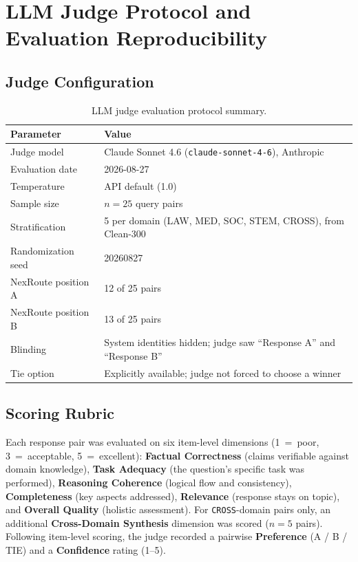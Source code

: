 \documentclass[a4paper,fleql,doubleblind]{cas-sc}
\begin{document}
\section{LLM Judge Protocol and Evaluation Reproducibility}
\label{supp:judge}

\subsection*{Judge Configuration}

\begin{table}[h]
\centering
\caption{LLM judge evaluation protocol summary.}
\small
\begin{tabular}{ll}
\toprule
\textbf{Parameter} & \textbf{Value} \\
\midrule
Judge model & Claude Sonnet 4.6 (\texttt{claude-sonnet-4-6}), Anthropic \\
Evaluation date & 2026-08-27 \\
Temperature & API default (1.0) \\
Sample size & $n{=}25$ query pairs \\
Stratification & 5 per domain (LAW, MED, SOC, STEM, CROSS), from Clean-300 \\
Randomization seed & 20260827 \\
NexRoute position A & 12 of 25 pairs \\
NexRoute position B & 13 of 25 pairs \\
Blinding & System identities hidden; judge saw ``Response A'' and ``Response B'' \\
Tie option & Explicitly available; judge not forced to choose a winner \\
\bottomrule
\end{tabular}
\end{table}

\subsection*{Scoring Rubric}

Each response pair was evaluated on six item-level dimensions
(1~=~poor, 3~=~acceptable, 5~=~excellent):
\textbf{Factual Correctness} (claims verifiable against domain knowledge),
\textbf{Task Adequacy} (the question's specific task was performed),
\textbf{Reasoning Coherence} (logical flow and consistency),
\textbf{Completeness} (key aspects addressed),
\textbf{Relevance} (response stays on topic), and
\textbf{Overall Quality} (holistic assessment).
For \texttt{CROSS}-domain pairs only, an additional
\textbf{Cross-Domain Synthesis} dimension was scored ($n{=}5$ pairs).
Following item-level scoring, the judge recorded a pairwise
\textbf{Preference} (A / B / TIE) and a \textbf{Confidence} rating (1--5).
\end{document}
